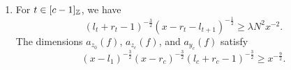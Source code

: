 \begin{lemma}
\begin{enumerate}
\[\]
for $e=\llbracket x,b\rrbracket\in\operatorname{Edge}(S)$, $x\in I_S$, and $b\in J_S$.
Let
\[
 R=\operatorname{Glue}_{\C}((S,(I_S,J_S));\mathbf T,\mathbf p,\mathbf g)
\]
satisfy hypotheses~\ref{hyp:gluing-attachments} and~\ref{hyp:gluing-slots} of Lemma~\ref{lem:flow-stability}.
Then, $R$ is stable.
\item\label{c:flow-choices-weight} For $t\in[c-1]_{\mathbb Z}$, we have
\begin{equation}\label{weight}
 (l_t+r_t-1)^{-\frac32}(x-r_t-l_{t+1})^{-\frac12}
 \ge\lambda N^2x^{-2}.
\end{equation}
The dimensions $a_{z_0}(f)$, $a_{z_c}(f)$, and $a_{y_c}(f)$ satisfy
\[
 (x-l_1)^{-\frac32}(x-r_c)^{-\frac32}(l_c+r_c-1)^{-\frac32}
 \ge x^{-\frac92}.
\]
\end{enumerate}
\end{lemma}
